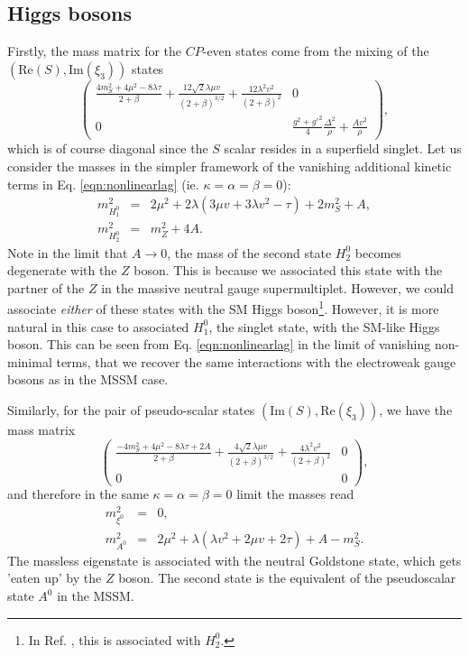 \subsection{Higgs bosons}
Firstly, the mass matrix for the $CP$-even states come from the mixing of the $(\text{Re}(S),\text{Im}(\xi_3))$ states
\begin{equation}
\begin{pmatrix} \frac{4m^2_S + 4\mu^2 -8\lambda \tau}{2+\beta}+\frac{12\sqrt{2}\lambda\mu v}{(2+\beta)^{3/2}}+\frac{12 \lambda^2 v^2}{(2+\beta)^2} & 0 \\
0 & \frac{g^2+g'^2}{4}\frac{\Delta^2}{\rho} + \frac{Av^2}{\rho}
\end{pmatrix},
\end{equation}
which is of course diagonal since the $S$ scalar resides in a superfield singlet. Let us consider the masses in the simpler framework of the vanishing additional kinetic terms in Eq. \ref{eqn:nonlinearlag} (ie. $\kappa=\alpha=\beta=0$):
\begin{eqnarray}
m^2_{H^0_1}&=&2\mu^2 + 2\lambda (3\mu v + 3\lambda v^2 -\tau) + 2m^2_S + A, \\
m^2_{H^0_2}&=&m^2_Z + 4A.
\end{eqnarray}
Note in the limit that $A \rightarrow 0$, the mass of the second state $H^0_2$ becomes degenerate with the $Z$ boson. This is because we associated this state with the partner of the $Z$ in the massive neutral gauge supermultiplet. However, we could associate \textit{either} of these states with the SM Higgs boson\footnote{In Ref. \cite{RN655}, this is associated with $H^0_2$.}. However, it is more natural in this case to associated $H^0_1$, the singlet state, with the SM-like Higgs boson. This can be seen from Eq. \ref{eqn:nonlinearlag} in the limit of vanishing non-minimal terms, that we recover the same interactions with the electroweak gauge bosons as in the MSSM case.

Similarly, for the pair of pseudo-scalar states $(\text{Im}(S),\text{Re}(\xi_3))$, we have the mass matrix
\begin{equation}
\begin{pmatrix} \frac{-4m^2_S + 4\mu^2 -8\lambda \tau+2A}{2+\beta}+\frac{4\sqrt{2}\lambda\mu v}{(2+\beta)^{3/2}}+\frac{4 \lambda^2 v^2}{(2+\beta)^2} & 0 \\
0 & 0
\end{pmatrix},
\end{equation}
and therefore in the same $\kappa=\alpha=\beta=0$ limit the masses read
\begin{eqnarray}
m^2_{\xi^0}&=&0, \\
m^2_{A^0}&=&2\mu^2 + \lambda (\lambda v^2 +2 \mu v + 2\tau)+A-m^2_S.
\end{eqnarray}
The massless eigenstate is associated with the neutral Goldstone state, which gets 'eaten up' by the $Z$ boson. The second state is the equivalent of the pseudoscalar state $A^0$ in the MSSM.

